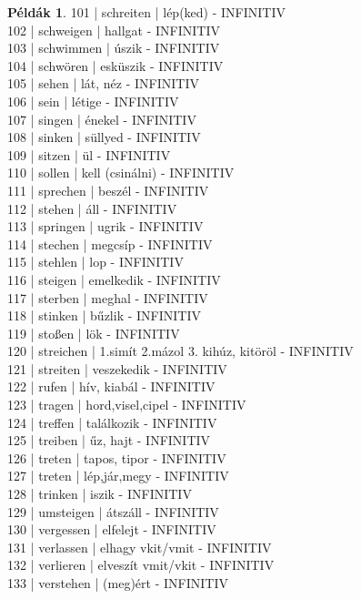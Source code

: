 \documentclass{article}
\theoremstyle{definition}
\newtheorem*{exmp}{Példák}
\begin{document}
\begin{exmp}
101 | schreiten | lép(ked) - INFINITIV\\
102 | schweigen | hallgat - INFINITIV\\
103 | schwimmen | úszik - INFINITIV\\
104 | schwören | esküszik - INFINITIV\\
105 | sehen | lát, néz - INFINITIV\\
106 | sein | létige - INFINITIV\\
107 | singen | énekel - INFINITIV\\
108 | sinken | süllyed - INFINITIV\\
109 | sitzen | ül - INFINITIV\\
110 | sollen | kell (csinálni) - INFINITIV\\
111 | sprechen | beszél - INFINITIV\\
112 | stehen | áll - INFINITIV\\
113 | springen | ugrik - INFINITIV\\
114 | stechen | megcsíp - INFINITIV\\
115 | stehlen | lop - INFINITIV\\
116 | steigen | emelkedik - INFINITIV\\
117 | sterben | meghal - INFINITIV\\
118 | stinken | bűzlik - INFINITIV\\
119 | stoßen | lök - INFINITIV\\
120 | streichen | 1.simít 2.mázol 3. kihúz, kitöröl - INFINITIV\\
121 | streiten | veszekedik - INFINITIV\\
122 | rufen | hív, kiabál - INFINITIV\\
123 | tragen | hord,visel,cipel - INFINITIV\\
124 | treffen | találkozik - INFINITIV\\
125 | treiben | űz, hajt - INFINITIV\\
126 | treten | tapos, tipor - INFINITIV\\
127 | treten | lép,jár,megy - INFINITIV\\
128 | trinken | iszik - INFINITIV\\
129 | umsteigen | átszáll - INFINITIV\\
130 | vergessen | elfelejt - INFINITIV\\
131 | verlassen | elhagy vkit/vmit - INFINITIV\\
132 | verlieren | elveszít vmit/vkit - INFINITIV\\
133 | verstehen | (meg)ért - INFINITIV\\

\end{exmp}
\end{document}
